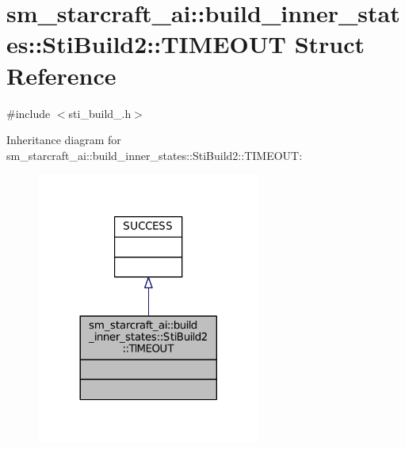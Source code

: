 \hypertarget{structsm__starcraft__ai_1_1build__inner__states_1_1StiBuild2_1_1TIMEOUT}{}\section{sm\+\_\+starcraft\+\_\+ai\+:\+:build\+\_\+inner\+\_\+states\+:\+:Sti\+Build2\+:\+:T\+I\+M\+E\+O\+UT Struct Reference}
\label{structsm__starcraft__ai_1_1build__inner__states_1_1StiBuild2_1_1TIMEOUT}


{\ttfamily \#include $<$sti\+\_\+build\+\_.\+h$>$}



Inheritance diagram for sm\+\_\+starcraft\+\_\+ai\+:\+:build\+\_\+inner\+\_\+states\+:\+:Sti\+Build2\+:\+:T\+I\+M\+E\+O\+UT\+:
\nopagebreak
\begin{figure}[H]
\begin{center}
\leavevmode
\includegraphics[width=209pt]{structsm__starcraft__ai_1_1build__inner__states_1_1StiBuild2_1_1TIMEOUT__inherit__graph}
\end{center}
\end{figure}


